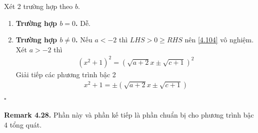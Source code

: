 \documentclass[a4paper,oneside]{book}
\numberwithin{equation}{chapter}
\begin{document}
Xét 2 trường hợp theo $b$.
\begin{enumerate}
\item \textbf{Trường hợp $b=0$.} Dễ.
\item \textbf{Trường hợp $b \ne 0$.} Nếu $a <  - 2$ thì $LHS > 0 \ge RHS$ nên \eqref{4.104} vô nghiệm.\\
Xét $a>-2$ thì
\begin{align}
{\left( {{x^2} + 1} \right)^2} = {\left( {\sqrt {a + 2} x \pm \sqrt {c + 1} } \right)^2}
\end{align}
Giải tiếp các phương trình bậc 2
\begin{align}
{x^2} + 1 =  \pm \left( {\sqrt {a + 2} x \pm \sqrt {c + 1} } \right)
\end{align}
\end{enumerate}
\hfill $\square$\\
\\
\textbf{Remark 4.28.} Phần này và phần kế tiếp là phần chuẩn bị cho phương trình bậc 4 tổng quát.
\end{document}
